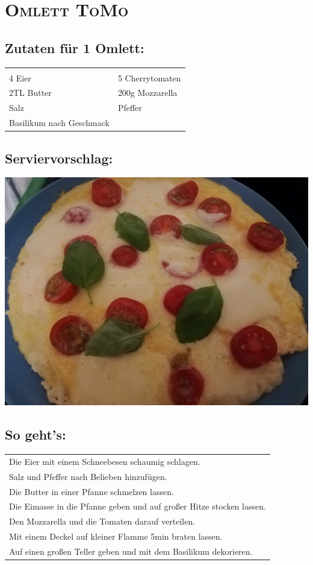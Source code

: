 \section{\textsc{Omlett ToMo}}

\subsection*{Zutaten für 1 Omlett:}

\begin{tabular}{p{7.5cm} p{7.5cm}}
	& \\
	4 Eier & 5 Cherrytomaten \\
	2TL Butter & 200g Mozzarella \\
	Salz & Pfeffer \\
	Basilikum nach Geschmack &
\end{tabular}

\subsection*{Serviervorschlag:}

\includegraphics[width=\textwidth]{img/omlett/omlett_tomo_fertig.jpg}

\subsection*{So geht's:}

\begin{tabular}{p{15cm}}
	\\
	Die Eier mit einem Schneebesen schaumig schlagen.\\
	Salz und Pfeffer nach Belieben hinzufügen.\\
	Die Butter in einer Pfanne schmelzen lassen.\\
	Die Eimasse in die Pfanne geben und auf großer Hitze stocken lassen.\\
	Den Mozzarella und die Tomaten darauf verteilen.\\
	Mit einem Deckel auf kleiner Flamme 5min braten lassen.\\
	Auf einen großen Teller geben und mit dem Basilikum dekorieren.\\
\end{tabular}
